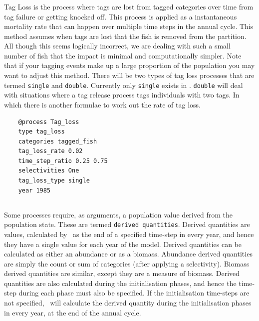 \subsubsection{}
Tag Loss is the process where tags are lost from tagged categories over time from tag failure or getting knocked off. This process is applied as a instantaneous mortality rate that can happen over multiple time steps in the annual cycle. This method assumes when tags are lost that the fish is removed from the partition. All though this seems logically incorrect, we are dealing with such a small number of fish that the impact is minimal and computationally simpler. Note that if your tagging events make up a large proportion of the population you may want to adjust this method. There will be two types of tag loss processes that are termed \texttt{single} and \texttt{double}. Currently only \texttt{single} exists in \CNAME. \texttt{double} will deal with situations where a tag release process tags individuals with two tags. In which there is another formulae to work out the rate of tag loss.


{\small{\begin{verbatim}
	@process Tag_loss
	type tag_loss
	categories tagged_fish
	tag_loss_rate 0.02
	time_step_ratio 0.25 0.75
	selectivities One
	tag_loss_type single
	year 1985
		\end{verbatim}}}


\subsection{\label{sec:derived-quantities}}
Some processes require, as arguments, a population value derived from the population state. These are termed \texttt{derived quantities}. Derived quantities are values, calculated by \CNAME\ as the end of a specified time-step in every year, and hence they have a single value for each year of the model. Derived quantities can be calculated as either an abundance or as a biomass. Abundance derived quantities are simply the count or sum of categories (after applying a selectivity). Biomass derived quantities are similar, except they are a measure of biomass. Derived quantities are also calculated during the initialisation phases, and hence the time-step during each phase must also be specified. If the initialisation time-steps are not specified, \CNAME\ will calculate the derived quantity during the initialisation phases in every year, at the end of the annual cycle. 

